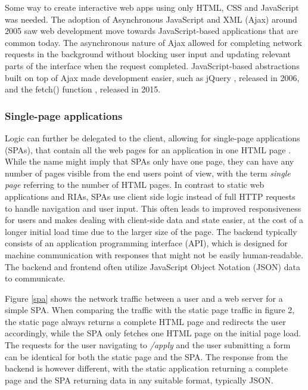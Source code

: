 Some way to create interactive web apps using only HTML, CSS and JavaScript was needed. The adoption of Asynchronous JavaScript and XML (Ajax) around 2005 saw web development move towards JavaScript-based applications that are common today. 
The asynchronous nature of Ajax allowed for completing network requests in the background without blocking user input and updating relevant parts of the interface when the request completed. 
JavaScript-based abstractions built on top of Ajax made development easier, such as jQuery \citep{openjsforg_jquery_nodate}, released in 2006, and the fetch() function \citep{noauthor_fetch_2023}, released in 2015. 

\subsubsection{Single-page applications}

Logic can further be delegated to the client, allowing for single-page applications (SPAs), that contain all the web pages for an application in one HTML page
\citep{fink_introducing_2014}. 
While the name might imply that SPAs only have one page, they can have any number of pages visible from the end users point of view, with the term \textit{single page} referring to the number of HTML pages.
In contrast to static web applications and RIAs, SPAs use client side logic instead of full HTTP requests to handle navigation and user input.
This often leads to improved responsiveness for users and makes dealing with client-side data and state easier, at the cost of a longer initial load time due to the larger size of the page.
The backend typically consists of an application programming interface (API), which is designed for machine communication with responses that might not be easily human-readable.
The backend and frontend often utilize JavaScript Object Notation (JSON) data to communicate.

Figure \ref{spa} shows the network traffic between a user and a web server for a simple SPA.
When comparing the traffic with the static page traffic in figure 2, the static page always returns a complete HTML page and redirects the user accordingly, while the SPA only fetches one HTML page on the initial page load.
The requests for the user navigating to \textit{/apply} and the user submitting a form can be identical for both the static page and the SPA.
The response from the backend is however different, with the static application returning a complete page and the SPA returning data in any suitable format, typically JSON.

